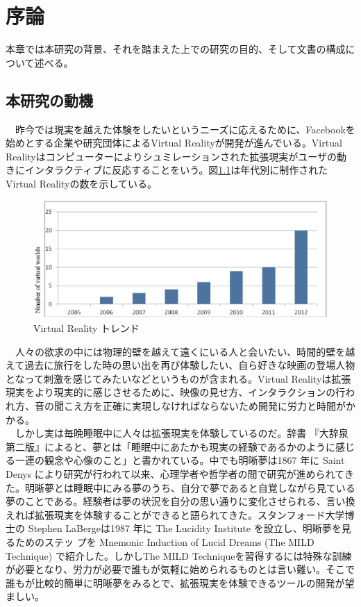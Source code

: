 \chapter{序論}
\label{chap:introduction}

本章では本研究の背景、それを踏まえた上での研究の目的、そして文書の構成について述べる。

\section{本研究の動機}
　昨今では現実を越えた体験をしたいというニーズに応えるために、Facebookを始めとする企業や研究団体によるVirtual Realityが開発が進んでいる\cite{vrtrendShiny}。Virtual Realityはコンピューターによりシュミレーションされた拡張現実がユーザの動きにインタラクティブに反応することをいう。図\ref{trends}は年代別に制作されたVirtual Realityの数を示している\cite{vrtrendSamuel}。\\

\begin{figure}[htbp]
\begin{center}
\includegraphics[width=15cm]{eps/vrTrends.eps}
\caption{Virtual Reality トレンド}
\label{trends}
\end{center}
\end{figure}

　人々の欲求の中には物理的壁を越えて遠くにいる人と会いたい、時間的壁を越えて過去に旅行をした時の思い出を再び体験したい、自ら好きな映画の登場人物となって刺激を感じてみたいなどというものが含まれる。Virtual Realityは拡張現実をより現実的に感じさせるために、映像の見せ方、インタラクションの行われ方、音の聞こえ方を正確に実現しなければならないため開発に労力と時間がかかる\cite{vrtrendShiny}。\\
　しかし実は毎晩睡眠中に人々は拡張現実を体験しているのだ。辞書 『大辞泉 第二版』によると、夢とは「睡眠中にあたかも現実の経験であるかのように感じる一連の観念や心像のこと」\cite{dream}と書かれている。中でも明晰夢は1867 年に Saint Denys により研究が行われて以来\cite{saintDenys}、心理学者や哲学者の間で研究が進められてきた。明晰夢とは睡眠中にみる夢のうち、自分で夢であると自覚しながら見ている夢のことである。経験者は夢の状況を自分の思い通りに変化させられる、言い換えれば拡張現実を体験することができると語られてきた。スタンフォード大学博士の Stephen LaBergeは1987 年に The Lucidity Institute を設立し、明晰夢を見るためのステッ プを Mnemonic Induction of Lucid Dreams (The MILD Technique) で紹介した\cite{LaBerge}。しかしThe MILD Techniqueを習得するには特殊な訓練が必要となり、労力が必要で誰もが気軽に始められるものとは言い難い。そこで誰もが比較的簡単に明晰夢をみるとで、拡張現実を体験できるツールの開発が望ましい。

